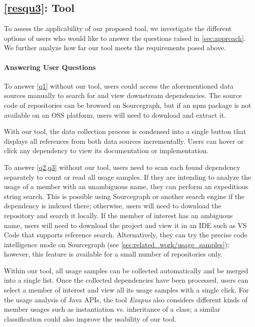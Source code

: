\subsection{\ref{resqu3}: Tool}
\label{sec:evaluation/resqu3}

To assess the applicability of our proposed tool, we investigate the different options of users who would like to answer the questions raised in \cref{sec:approach}.
We further analyze how far our tool meets the requirements posed above.

\paragraph{Answering User Questions}

To answer \cref{q1} without our tool, users could access the aforementioned data sources manually to search for and view downstream dependencies.
The source code of repositories can be browsed on Sourcegraph, but if an npm package is not available on an OSS platform, users will need to download and extract it.

With our tool, the data collection process is condensed into a single button that displays all references from both data sources incrementally.
Users can hover or click any dependency to view its documentation or implementation.

To answer \cref{q2,q3} without our tool, users need to scan each found dependency separately to count or read all usage samples.
If they are intending to analyze the usage of a member with an unambiguous name, they can perform an expeditious string search.
This is possible using Sourcegraph or another search engine if the dependency is indexed there; otherwise, users will need to download the repository and search it locally.
If the member of interest has an ambiguous name, users will need to download the project and view it in an IDE such as VS Code that supports reference search.
Alternatively, they can try the precise code intelligence mode on Sourcegraph (see \cref{sec:related_work/usage_samples}); however, this feature is available for a small number of repositories only.

Within our tool, all usage samples can be collected automatically and be merged into a single list.
Once the collected dependencies have been processed, users can select a member of interest and view all its usage samples with a single click.
For the usage analysis of Java APIs, the tool \emph{Exapus} \citep{de2013multi} also considers different kinds of member usages such as instantiation vs. inheritance of a class; a similar classification could also improve the usability of our tool.

